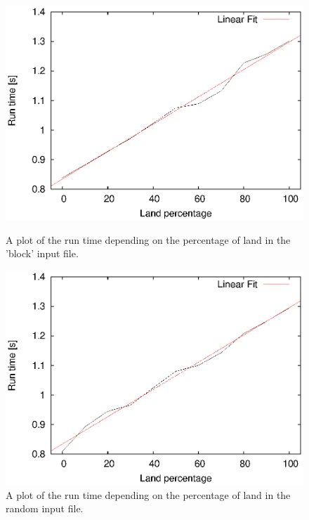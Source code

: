 \documentclass[12pt,a4paper]{article}
\begin{document}
\begin{figure}[ht]
\begin{minipage}[b]{0.475\linewidth}
\centering
\includegraphics[width=\textwidth]{img/percentage.eps}
\caption{A plot of the run time depending on the percentage of land in the 
'block' input file.}
\label{fig:3}
\end{minipage}
\hspace{0.5cm}
\begin{minipage}[b]{0.475\linewidth}
\centering
\includegraphics[width=\textwidth]{img/percentage_rand.eps}
\caption{A plot of the run time depending on the percentage of land in the 
random input file.}
\label{fig:4}
\end{minipage}
\end{figure}
\end{document}
